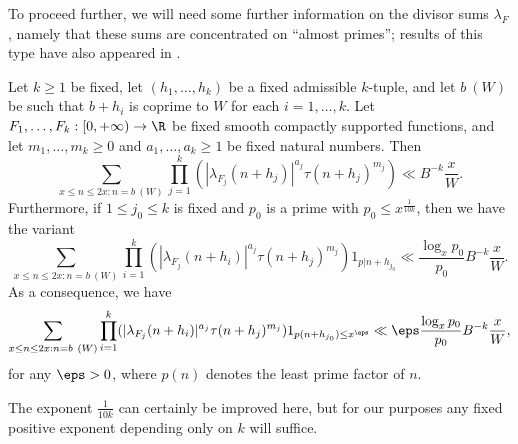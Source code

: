 To proceed further, we will need some further information on the divisor sums $\lambda_F$, namely that these sums are concentrated on ``almost primes''; results of this type have also appeared in \cite{pintz-szemeredi}.

\begin{proposition}\label{almostprime} Let $k \geq 1$ be fixed, let $(h_1,\dots,h_k)$ be a fixed admissible $k$-tuple, and let $b\ (W)$ be such that $b+h_i$ is coprime to $W$ for each $i=1,\dots,k$.  Let $F_1,\dots,F_k: [0,+\infty) \to \R$ be fixed smooth compactly supported functions, and let $m_1,\dots,m_k \geq 0$ and $a_1,\dots,a_k \geq 1$ be fixed natural numbers.  Then
\begin{equation}\label{lambdatau}
\sum_{x \leq n \leq 2x: n = b\ (W)} \prod_{j=1}^k (|\lambda_{F_j}(n+h_j)|^{a_j} \tau(n+h_j)^{m_j}) \ll B^{-k} \frac{x}{W}.
\end{equation}
Furthermore, if $1 \leq j_0 \leq k$ is fixed and $p_0$ is a prime with $p_0 \leq x^{\frac{1}{10k}}$, then we have the variant
\begin{equation}\label{lambdatau-fix}
\sum_{x \leq n \leq 2x: n = b\ (W)} \prod_{i=1}^k (|\lambda_{F_j}(n+h_i)|^{a_j} \tau(n+h_j)^{m_j}) 1_{p|n+h_{j_0}} \ll \frac{\log_x p_0}{p_0} B^{-k} \frac{x}{W}.
\end{equation}
As a consequence, we have
\begin{equation}\label{lambdatau-fix2}
\sum_{x \leq n \leq 2x: n = b\ (W)} \prod_{i=1}^k (|\lambda_{F_j}(n+h_i)|^{a_j} \tau(n+h_j)^{m_j}) 1_{p(n+h_{j_0}) \leq x^\eps} \ll \eps \frac{\log_x p_0}{p_0} B^{-k} \frac{x}{W},
\end{equation}
for any $\eps > 0$, where $p(n)$ denotes the least prime factor of $n$.
\end{proposition}

The exponent $\frac{1}{10k}$ can certainly be improved here, but for our purposes any fixed positive exponent depending only on $k$ will suffice.


